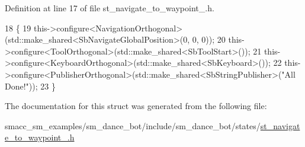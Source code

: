 Definition at line 17 of file st\+\_\+navigate\+\_\+to\+\_\+waypoint\+\_.\+h.


\begin{DoxyCode}
18   \{
19      this->configure<NavigationOrthogonal>(std::make\_shared<SbNavigateGlobalPosition>(0, 0, 0));
20      this->configure<ToolOrthogonal>(std::make\_shared<SbToolStart>());
21      this->configure<KeyboardOrthogonal>(std::make\_shared<SbKeyboard>());
22      this->configure<PublisherOrthogonal>(std::make\_shared<SbStringPublisher>(\textcolor{stringliteral}{"All Done!"}));
23   \}
\end{DoxyCode}


The documentation for this struct was generated from the following file\+:\begin{DoxyCompactItemize}
\item 
smacc\+\_\+sm\+\_\+examples/sm\+\_\+dance\+\_\+bot/include/sm\+\_\+dance\+\_\+bot/states/\hyperlink{st__navigate__to__waypoint__1_8h}{st\+\_\+navigate\+\_\+to\+\_\+waypoint\+\_.\+h}\end{DoxyCompactItemize}
